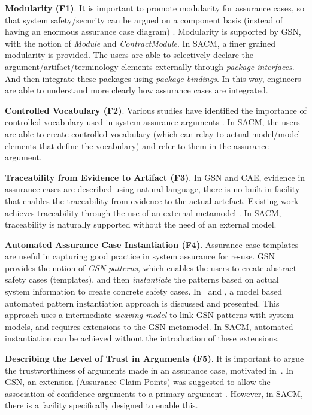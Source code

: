 \textbf{Modularity (F1)}. It is important to promote modularity for assurance cases, so that system safety/security can be argued on a component basis (instead of having an enormous assurance case diagram) \cite{despotou2008investigating}. 
Modularity is supported by GSN, with the notion of \textit{Module} and \textit{ContractModule}.
In SACM, a finer grained modularity is provided. 
The users are able to selectively declare the argument/artifact/terminology elements externally through \textit{package interfaces}. 
And then integrate these packages using \textit{package bindings}.
In this way, engineers are able to understand more clearly how assurance cases are integrated.

\textbf{Controlled Vocabulary (F2)}. Various studies have identified the importance of controlled vocabulary used in system assurance arguments \cite{luo2015safety, attwood2014use}. 
In SACM, the users are able to create controlled vocabulary (which can relay to actual model/model elements that define the vocabulary) and refer to them in the assurance argument. 

\textbf{Traceability from Evidence to Artifact (F3)}. In GSN and CAE, evidence in assurance cases are described using natural language, there is no built-in facility that enables the traceability from evidence to the actual artefact. 
Existing work achieves traceability through the use of an external metamodel \cite{taguchi2014linking}.
In SACM, traceability is naturally supported without the need of an external model.

\textbf{Automated Assurance Case Instantiation (F4)}. Assurance case templates are useful in capturing good practice in system assurance for re-use.
GSN provides the notion of \textit{GSN patterns}, which enables the users to create abstract safety cases (templates), and then \textit{instantiate} the patterns based on actual system information to create concrete safety cases. 
In~\cite{hawkins2015need} and \cite{hawkins2015weaving}, a model based automated pattern instantiation approach is discussed and presented. 
This approach uses a intermediate \textit{weaving model} to link GSN patterns with system models, and requires extensions to the GSN metamodel. 
In SACM, automated instantiation can be achieved without the introduction of these extensions. 

\textbf{Describing the Level of Trust in Arguments (F5)}. It is important to argue the trustworthiness of arguments made in an assurance case, motivated in~\cite{hawkins2011new}. 
In GSN, an extension (Assurance Claim Points) was suggested to allow the association of confidence arguments to a primary argument \cite{hawkins2011new}.  
However, in SACM, there is a facility specifically designed to enable this.

